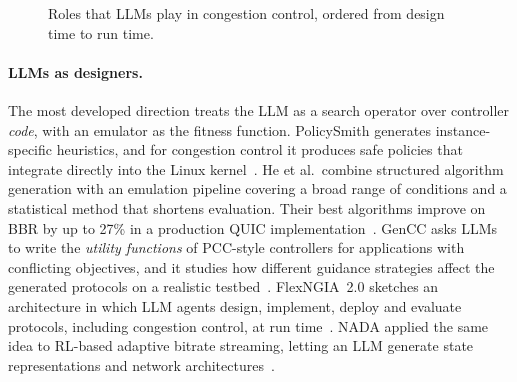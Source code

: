 \begin{figure}[t]
\centering
{}
\caption{Roles that LLMs play in congestion control, ordered from design time to run time.}
\label{fig:llm-roles}
\end{figure}

\paragraph{LLMs as designers.} The most developed direction treats the LLM as a search operator over controller \emph{code}, with an emulator as the fitness function. PolicySmith generates instance-specific heuristics, and for congestion control it produces safe policies that integrate directly into the Linux kernel~\cite{dwivedula2025man}. He et al.\ combine structured algorithm generation with an emulation pipeline covering a broad range of conditions and a statistical method that shortens evaluation. Their best algorithms improve on BBR by up to 27\% in a production QUIC implementation~\cite{he2025congestion}. GenCC asks LLMs to write the \emph{utility functions} of PCC-style controllers for applications with conflicting objectives, and it studies how different guidance strategies affect the generated protocols on a realistic testbed~\cite{rozenschiff2026utility,rozenschiff2026gencc}. FlexNGIA~2.0 sketches an architecture in which LLM agents design, implement, deploy and evaluate protocols, including congestion control, at run time~\cite{zhani2025flexngia}. NADA applied the same idea to RL-based adaptive bitrate streaming, letting an LLM generate state representations and network architectures~\cite{he2024nada}.

